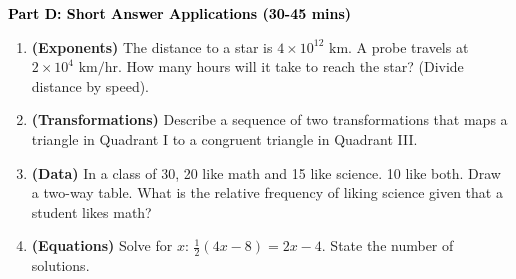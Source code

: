 \documentclass[12pt, letterpaper, fleqn]{article}
\begin{document}
\begin{tcolorbox}[colback=customteal!20]
\large\textcolor{black}{\textbf{Part D: Short Answer Applications (30-45 mins)}}
\end{tcolorbox}

\vspace{3mm}

\begin{enumerate}[itemsep=4.2cm, leftmargin=0.6cm, resume]
\item \textbf{(Exponents)} The distance to a star is $4 \times 10^{12}\text{ km}$. A probe travels at $2 \times 10^4\text{ km/hr}$. How many hours will it take to reach the star? (Divide distance by speed).
\item \textbf{(Transformations)} Describe a sequence of two transformations that maps a triangle in Quadrant I to a congruent triangle in Quadrant III.
\item \textbf{(Data)} In a class of 30, 20 like math and 15 like science. 10 like both. Draw a two-way table. What is the relative frequency of liking science given that a student likes math?
\item \textbf{(Equations)} Solve for $x$: $\frac{1}{2}(4x - 8) = 2x - 4$. State the number of solutions.
\end{enumerate}
\end{document}
